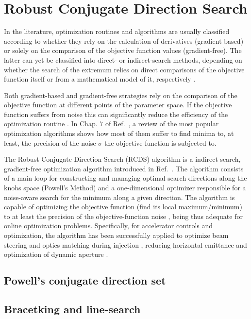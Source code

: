 \section{Robust Conjugate Direction Search}
In the literature, optimization routines and algorithms are usually classified according to whether they rely on the calculation of derivatives (gradient-based) or solely on the comparison of the objective function values (gradient-free). The latter can yet be classified into direct- or indirect-search methods, depending on whether the search of the extremum relies on direct comparisons of the objective function itself or from a mathematical model of it, respectively \cite{numerical_recipes}.

Both gradient-based and gradient-free strategies rely on the comparison of the objective function at different points of the parameter space. If the objective function suffers from noise this can significantly reduce the efficiency of the optimization routine \cite{numerical_recipes, huang2019beam}. In Chap. 7 of Ref.~\cite{huang2019beam}, a review of the most popular optimization algorithms shows how most of them suffer to find minima to, at least, the precision of the noise-$\sigma$ the objective function is subjected to.

The Robust Conjugate Direction Search (RCDS) algorithm is a indirect-search, gradient-free optimization algorithm introduced in Ref.~\cite{Huang:2013}. The algorithm consists of a main loop for constructing and managing optimal search directions along the knobs space (Powell's Method) and a one-dimensional optimizer responsible for a noise-aware search for the minimum along a given direction. The algorithm is capable of optimizing the objective function (find its local maximum/minimum) to at least the precision of the objective-function noise \cite{Huang:2013, huang2019beam}, being thus adequate for online optimization problems. Specifically, for accelerator controls and optimization, the algorithm has been successfully applied to optimize beam steering and optics matching during injection \cite{Huang:2013}, reducing horizontal emittance \cite{Huang:2013, Huang:2015}and optimization of dynamic aperture \cite{Huang:2013,Huang:2015,Liuzzo:IPAC2016-THPMR015,Olsson:IPAC2018-WEPAL047,yang:ipac2022-tupopt064}.
\subsection{Powell's conjugate direction set}

\subsection{Bracetking and line-search}

